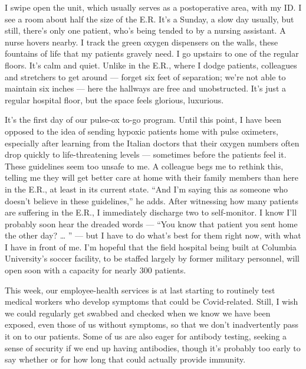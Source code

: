 I swipe open the unit, which usually serves as a post­operative area,
with my ID. I see a room about half the size of the E.R. It's a Sunday,
a slow day usually, but still, there's only one patient, who's being
tended to by a nursing assistant. A nurse hovers nearby. I track the
green oxygen dispensers on the walls, these fountains of life that my
patients gravely need. I go upstairs to one of the regular floors. It's
calm and quiet. Unlike in the E.R., where I dodge patients, colleagues
and stretchers to get around --- forget six feet of separation; we're
not able to maintain six inches --- here the hallways are free and
unobstructed. It's just a regular hospital floor, but the space feels
glorious, luxurious.

It's the first day of our pulse-ox to-go program. Until this point, I
have been opposed to the idea of sending hypoxic patients home with
pulse oximeters, especially after learning from the Italian doctors that
their oxygen numbers often drop quickly to life-threatening levels ---
sometimes before the patients feel it. These guidelines seem too unsafe
to me. A colleague begs me to rethink this, telling me they will get
better care at home with their family members than here in the E.R., at
least in its current state. ``And I'm saying this as someone who doesn't
believe in these guidelines,'' he adds. After witnessing how many
patients are suffering in the E.R., I immediately discharge two to
self-monitor. I know I'll probably soon hear the dreaded words --- ``You
know that patient you sent home the other day? \ldots{} '' --- but I
have to do what's best for them right now, with what I have in front of
me. I'm hopeful that the field hospital being built at Columbia
University's soccer facility, to be staffed largely by former military
personnel, will open soon with a capacity for nearly 300 patients.

This week, our employee-health services is at last starting to routinely
test medical workers who develop symptoms that could be Covid-related.
Still, I wish we could regularly get swabbed and checked when we know we
have been exposed, even those of us without symptoms, so that we don't
inadvertently pass it on to our patients. Some of us are also eager for
antibody testing, seeking a sense of security if we end up having
antibodies, though it's probably too early to say whether or for how
long that could actually provide immunity.

